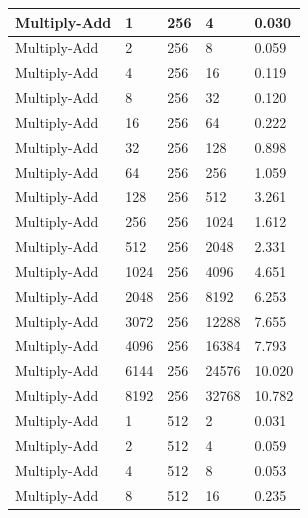 \documentclass{article}
\begin{document}
\begin{longtable}{|l|l|l|l|l|}
Multiply-Add       & 1    & 256         & 4                 & 0.030             \\ \hline
Multiply-Add       & 2    & 256         & 8                 & 0.059             \\ \hline
Multiply-Add       & 4    & 256         & 16                & 0.119             \\ \hline
Multiply-Add       & 8    & 256         & 32                & 0.120             \\ \hline
Multiply-Add       & 16   & 256         & 64                & 0.222             \\ \hline
Multiply-Add       & 32   & 256         & 128               & 0.898             \\ \hline
Multiply-Add       & 64   & 256         & 256               & 1.059             \\ \hline
Multiply-Add       & 128  & 256         & 512               & 3.261             \\ \hline
Multiply-Add       & 256  & 256         & 1024              & 1.612             \\ \hline
Multiply-Add       & 512  & 256         & 2048              & 2.331             \\ \hline
Multiply-Add       & 1024 & 256         & 4096              & 4.651             \\ \hline
Multiply-Add       & 2048 & 256         & 8192              & 6.253             \\ \hline
Multiply-Add       & 3072 & 256         & 12288             & 7.655             \\ \hline
Multiply-Add       & 4096 & 256         & 16384             & 7.793             \\ \hline
Multiply-Add       & 6144 & 256         & 24576             & 10.020            \\ \hline
Multiply-Add       & 8192 & 256         & 32768             & 10.782            \\ \hline
Multiply-Add       & 1    & 512         & 2                 & 0.031             \\ \hline
Multiply-Add       & 2    & 512         & 4                 & 0.059             \\ \hline
Multiply-Add       & 4    & 512         & 8                 & 0.053             \\ \hline
Multiply-Add       & 8    & 512         & 16                & 0.235             \\ \hline

\end{longtable}
\end{document}
